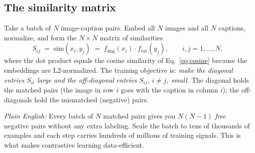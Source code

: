 \documentclass[11pt]{article}
\theoremstyle{remark}
\newcommand{\fimg}{f_{\text{img}}}
\newcommand{\ftxt}{f_{\text{txt}}}
\newcommand{\simop}{\mathrm{sim}}
\newcommand{\plain}[1]{\medskip\noindent\textit{Plain English:} #1\medskip}
\begin{document}
\subsection{The similarity matrix}
Take a batch of $N$ image-caption pairs. Embed all $N$ images and all $N$ captions, normalize, and form the $N \times N$ matrix of similarities
\begin{equation}
S_{ij} \;=\; \simop(x_i, y_j) \;=\; \fimg(x_i) \cdot \ftxt(y_j), \qquad i, j = 1, \dots, N,
\label{eq:simmatrix}
\end{equation}
where the dot product equals the cosine similarity of Eq.~\eqref{eq:cosine} because the embeddings are L2-normalized. The training objective is: \emph{make the diagonal entries $S_{ii}$ large and the off-diagonal entries $S_{ij}$, $i \neq j$, small.} The diagonal holds the matched pairs (the image in row $i$ goes with the caption in column $i$); the off-diagonals hold the mismatched (negative) pairs.

\plain{Every batch of $N$ matched pairs gives you $N(N-1)$ \emph{free} negative pairs without any extra labeling. Scale the batch to tens of thousands of examples and each step carries hundreds of millions of training signals. This is what makes contrastive learning data-efficient.}
\end{document}

